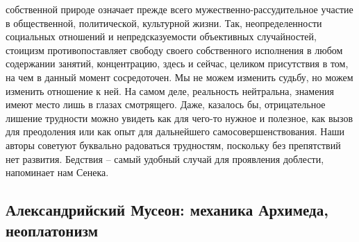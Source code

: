 собственной природе означает прежде всего мужественно-рассудительное участие в
общественной, политической, культурной жизни. Так, неопределенности социальных
отношений и непредсказуемости объективных случайностей, стоицизм
противопоставляет свободу своего собственного исполнения в любом содержании
занятий, концентрацию, здесь и сейчас, целиком присутствия в том, на чем в
данный момент сосредоточен. Мы не можем изменить судьбу, но можем изменить
отношение к ней. На самом деле, реальность нейтральна, знамения имеют место лишь
в глазах смотрящего. Даже, казалось бы, отрицательное лишение трудности можно
увидеть как для чего-то нужное и полезное, как вызов для преодоления или как
опыт для дальнейшего самосовершенствования. Наши авторы советуют буквально
радоваться трудностям, поскольку без препятствий нет развития. Бедствия – самый
удобный случай для проявления доблести, напоминает нам Сенека. 

\subsection{Александрийский Мусеон: механика Архимеда, неоплатонизм}

